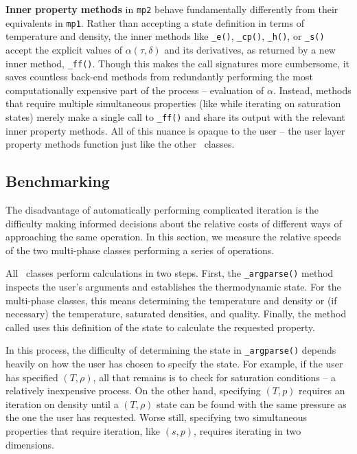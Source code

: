 \textbf{Inner property methods} in \texttt{mp2} behave fundamentally differently from their equivalents in \texttt{mp1}.  Rather than accepting a state definition in terms of temperature and density, the inner methods like \verb|_e()|, \verb|_cp()|, \verb|_h()|, or \verb|_s()| accept the explicit values of $\alpha(\tau, \delta)$ and its derivatives, as returned by a new inner method, \verb|_ff()|.  Though this makes the call signatures more cumbersome, it saves countless back-end methods from redundantly performing the most computationally expensive part of the process -- evaluation of $\alpha$.  Instead, methods that require multiple simultaneous properties (like while iterating on saturation states) merely make a single call to \verb|_ff()| and share its output with the relevant inner property methods.  All of this nuance is opaque to the user -- the user layer property methods function just like the other \PM\ classes.

\subsection{Benchmarking}

The disadvantage of automatically performing complicated iteration is the difficulty making informed decisions about the relative costs of different ways of approaching the same operation.  In this section, we measure the relative speeds of the two multi-phase classes performing a series of operations.  

All \PM\ classes perform calculations in two steps.  First, the \verb|_argparse()| method inspects the user's arguments and establishes the thermodynamic state.  For the multi-phase classes, this means determining the temperature and density or (if necessary) the temperature, saturated densities, and quality.  Finally, the method called uses this definition of the state to calculate the requested property.  

In this process, the difficulty of determining the state in \verb|_argparse()| depends heavily on how the user has chosen to specify the state.  For example, if the user has specified $(T,\rho)$, all that remains is to check for saturation conditions -- a relatively inexpensive process.  On the other hand, specifying $(T,p)$ requires an iteration on density until a $(T,\rho)$ state can be found with the same pressure as the one the user has requested.  Worse still, specifying two simultaneous properties that require iteration, like $(s,p)$, requires iterating in two dimensions.

